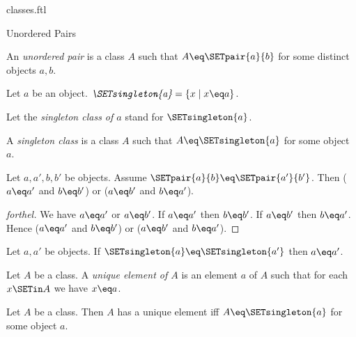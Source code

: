 \documentclass{naproche-library}
\begin{document}
\begin{smodule}[title=Classes]{classes.ftl}
\begin{sfragment}{Unordered Pairs}

  \begin{definition}[forthel,id=FOUNDATIONS_01_605432672419840]
    An \emph{unordered pair} is a class $A$ such that $A \eq \SETpair{a}{b}$ for some distinct objects $a, b$.
  \end{definition}

  \begin{definition}[forthel,id=FOUNDATIONS_01_1160414603771904]
    Let $a$ be an object.
    $\emph{\SETsingleton{a}} = \{ x \mid x \eq a \}$.

    Let the \emph{singleton class of $a$} stand for $\SETsingleton{a}$.
  \end{definition}


  \begin{definition}[forthel,id=FOUNDATIONS_01_6786618161627136]
    A \emph{singleton class} is a class $A$ such that $A \eq \SETsingleton{a}$ for some object $a$.
  \end{definition}

  \begin{proposition}[forthel,id=FOUNDATIONS_01_6125259604361216]
    Let $a, a', b, b'$ be objects.
    Assume $\SETpair{a}{b} \eq \SETpair{a'}{b'}$.
    Then ($a \eq a'$ and $b \eq b'$) or ($a \eq b'$ and $b \eq a'$).
  \end{proposition}
  \begin{proof}[forthel]
    We have $a \eq a'$ or $a \eq b'$.
    If $a \eq a'$ then $b \eq b'$.
    If $a \eq b'$ then $b \eq a'$.
    Hence ($a \eq a'$ and $b \eq b'$) or ($a \eq b'$ and $b \eq a'$).
  \end{proof}

  \begin{corollary}[forthel,id=FOUNDATIONS_01_6954678910713856]
    Let $a, a'$ be objects.
    If $\SETsingleton{a} \eq \SETsingleton{a'}$ then $a \eq a'$.
  \end{corollary}


  \begin{definition}[forthel,id=FOUNDATIONS_01_29867480293464351]
    Let $A$ be a class.
    A \emph{unique element of $A$} is an element $a$ of $A$ such that for each $x \SETin A$ we have $x \eq a$.
  \end{definition}

  \begin{proposition}[forthel,id=FOUNDATIONS_01_0166348647163481]
    Let $A$ be a class.
    Then $A$ has a unique element iff $A \eq \SETsingleton{a}$ for some object $a$.
  \end{proposition}
\end{sfragment}


\end{smodule}
\end{document}
